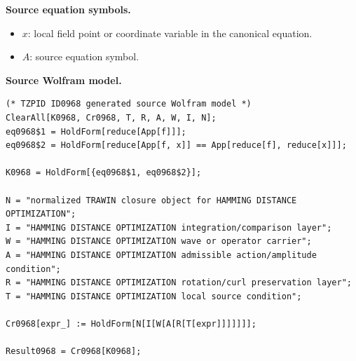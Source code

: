 \begin{minipage}[t]{0.49\linewidth}
\begingroup
\small
\raggedright
\textbf{Source equation symbols.}\par
\begin{itemize}[leftmargin=1.35em,itemsep=1pt,topsep=1pt,parsep=0pt]
    \item $x$: local field point or coordinate variable in the canonical equation.
    \item $A$: source equation symbol.
\end{itemize}
\endgroup
\end{minipage}\hfill
\begin{minipage}[t]{0.47\linewidth}
\begingroup
\scriptsize
\raggedright
\textbf{Source Wolfram model.}\par
\begin{Verbatim}[fontsize=\tiny,breaklines=true,breakanywhere=true]
(* TZPID ID0968 generated source Wolfram model *)
ClearAll[K0968, Cr0968, T, R, A, W, I, N];
eq0968$1 = HoldForm[reduce[App[f]]];
eq0968$2 = HoldForm[reduce[App[f, x]] == App[reduce[f], reduce[x]]];

K0968 = HoldForm[{eq0968$1, eq0968$2}];

N = "normalized TRAWIN closure object for HAMMING DISTANCE OPTIMIZATION";
I = "HAMMING DISTANCE OPTIMIZATION integration/comparison layer";
W = "HAMMING DISTANCE OPTIMIZATION wave or operator carrier";
A = "HAMMING DISTANCE OPTIMIZATION admissible action/amplitude condition";
R = "HAMMING DISTANCE OPTIMIZATION rotation/curl preservation layer";
T = "HAMMING DISTANCE OPTIMIZATION local source condition";

Cr0968[expr_] := HoldForm[N[I[W[A[R[T[expr]]]]]]];

Result0968 = Cr0968[K0968];
\end{Verbatim}
\endgroup
\end{minipage}

